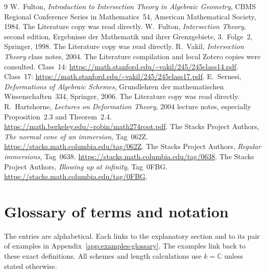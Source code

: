 \documentclass[11pt,a4paper]{article}
\numberwithin{equation}{section}
\theoremstyle{definition}
\begin{document}
\begin{thebibliography}{9}
 W.~Fulton, \emph{Introduction to Intersection Theory
in Algebraic Geometry}, CBMS Regional Conference Series in Mathematics~54,
American Mathematical Society, 1984. The Literature copy was read directly.
 W.~Fulton, \emph{Intersection Theory}, second edition,
Ergebnisse der Mathematik und ihrer Grenzgebiete, 3.~Folge~2,
Springer, 1998. The Literature copy was read directly.
 R.~Vakil, \emph{Intersection Theory} class notes, 2004.
The Literature compilation and local Zotero copies were consulted.
Class~14: \url{https://math.stanford.edu/~vakil/245/245class14.pdf}.
Class~17: \url{https://math.stanford.edu/~vakil/245/245class17.pdf}.
 E.~Sernesi, \emph{Deformations of Algebraic Schemes},
Grundlehren der mathematischen Wissenschaften~334, Springer, 2006.
The Literature copy was read directly.
 R.~Hartshorne, \emph{Lectures on Deformation Theory},
2004 lecture notes, especially Proposition~2.3 and Theorem~2.4.
\url{https://math.berkeley.edu/~robin/math274root.pdf}.
 The Stacks Project Authors, \emph{The normal cone
of an immersion}, Tag~062Z.
\url{https://stacks.math.columbia.edu/tag/062Z}.
 The Stacks Project Authors, \emph{Regular
immersions}, Tag~0638. \url{https://stacks.math.columbia.edu/tag/0638}.
 The Stacks Project Authors, \emph{Blowing up at
infinity}, Tag~0FBG. \url{https://stacks.math.columbia.edu/tag/0FBG}.
\end{thebibliography}

\newpage
\section{Glossary of terms and notation}
\label{app:glossary}

The entries are alphabetical. Each links to the explanatory section
and to its pair of examples in Appendix~\ref{app:examples-glossary}.
The examples link back to these exact definitions. All schemes and
length calculations use $k=\mathbb C$ unless stated otherwise.

\newcommand{\glossentry}[4]{%
  \par\smallskip\phantomsection\label{gloss:#1}%
  \noindent\textbf{#2.}\ #3\ %
  \hyperref[#4]{\textit{Section~\ref*{#4}.}}\ %
  \hyperref[examples:#1]{\textit{Examples (Appendix~\ref*{app:examples-glossary}).}}\par}
\end{document}
